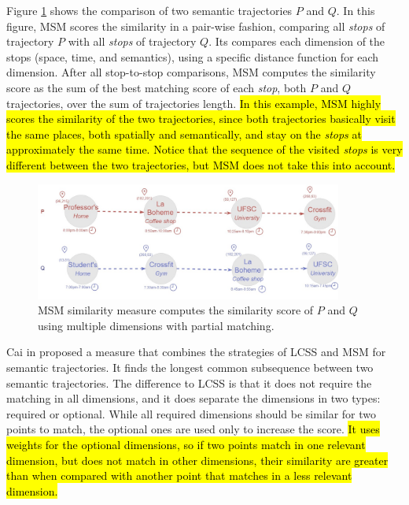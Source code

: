 Figure \ref{fig:related_trajes_MSM} shows the comparison of two semantic trajectories $P$ and $Q$. In this figure, MSM scores the similarity in a pair-wise fashion, comparing all \emph{stops} of trajectory $P$ with all \emph{stops} of trajectory $Q$. Its compares each dimension of the stops (space, time, and semantics), using a specific distance function for each dimension. After all stop-to-stop comparisons, MSM computes the similarity score as the sum of the best matching score of each \emph{stop}, both $P$ and $Q$ trajectories, over the sum of trajectories length. \hl{In this example, MSM highly scores the similarity of the two trajectories, since both trajectories basically visit the same places, both  spatially and semantically, and stay on the \emph{stops} at approximately the same time. Notice that the sequence of the visited \emph{stops} is very different between the two trajectories, but MSM does not take this into account.}

\begin{figure}[h]
\centering
\includegraphics[width=0.9\textwidth]{Related_Works/Semantic_Trajectories_(MSM).jpg}
\caption{\label{fig:related_trajes_MSM}MSM similarity measure computes the similarity score of $P$ and $Q$ using multiple dimensions with partial matching.}
\end{figure}

Cai in \cite{CaiLee2016} proposed a measure that combines the strategies of LCSS \cite{vlachos2002discovering} and MSM\cite{Furtado:TGIS12156} for semantic trajectories. It finds the longest common subsequence between two semantic trajectories. The difference to LCSS is that it does not require the matching in all dimensions, and it does separate the dimensions in two types: required or optional. While all required dimensions should be similar for two points to match, the optional ones are used only to increase the score. \hl{It uses weights for the optional dimensions, so if two points match in one relevant dimension, but does not match in other dimensions, their similarity are greater than when compared with another point that matches in a less relevant dimension.}

